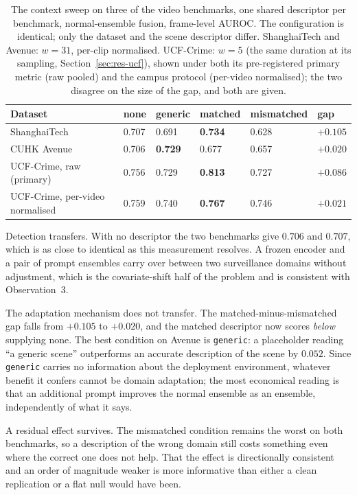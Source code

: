 \documentclass[a4paper,fleqn]{cas-sc}
\begin{document}
\begin{table}[width=\linewidth,cols=6,pos=htbp]
\caption{The context sweep on three of the video benchmarks, one shared
descriptor per benchmark, normal-ensemble fusion, frame-level AUROC. The
configuration is identical; only the dataset and the scene descriptor differ.
ShanghaiTech and Avenue: $w{=}31$, per-clip normalised. UCF-Crime: $w{=}5$ (the
same duration at its sampling, Section~\ref{sec:res-ucf}), shown under both its
pre-registered primary metric (raw pooled) and the campus protocol (per-video
normalised); the two disagree on the size of the gap, and both are given.}
\label{tbl:avenue}
\begin{tabularx}{\linewidth}{@{}Z l l l l l@{}}
\toprule
\textbf{Dataset} & \textbf{none} & \textbf{generic} & \textbf{matched} & \textbf{mismatched} & \textbf{gap} \\
\midrule
ShanghaiTech & 0.707 & 0.691 & \textbf{0.734} & 0.628 & $+0.105$ \\
CUHK Avenue  & 0.706 & \textbf{0.729} & 0.677 & 0.657 & $+0.020$ \\
UCF-Crime, raw (primary)        & 0.756 & 0.729 & \textbf{0.813} & 0.727 & $+0.086$ \\
UCF-Crime, per-video normalised & 0.759 & 0.740 & \textbf{0.767} & 0.746 & $+0.021$ \\
\bottomrule
\end{tabularx}
\end{table}

Detection transfers. With no descriptor the two benchmarks give $0.706$ and
$0.707$, which is as close to identical as this measurement resolves. A frozen
encoder and a pair of prompt ensembles carry over between two surveillance
domains without adjustment, which is the covariate-shift half of the problem and
is consistent with Observation~3.

The adaptation mechanism does not transfer. The matched-minus-mismatched gap
falls from $+0.105$ to $+0.020$, and the matched descriptor now scores
\emph{below} supplying none. The best condition on Avenue is \texttt{generic}: a
placeholder reading ``a generic scene'' outperforms an accurate description of
the scene by $0.052$. Since \texttt{generic} carries no information about the
deployment environment, whatever benefit it confers cannot be domain adaptation;
the most economical reading is that an additional prompt improves the normal
ensemble as an ensemble, independently of what it says.

A residual effect survives. The mismatched condition remains the worst on both
benchmarks, so a description of the wrong domain still costs something even
where the correct one does not help. That the effect is directionally consistent
and an order of magnitude weaker is more informative than either a clean
replication or a flat null would have been.
\end{document}
